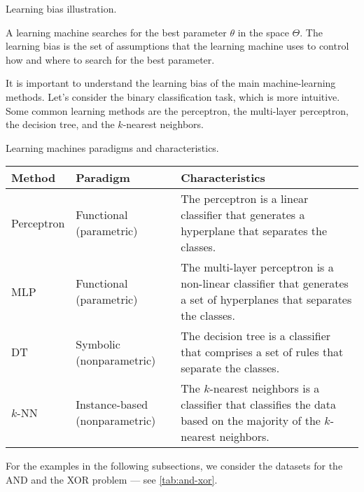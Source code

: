 \begin{figurebox}[label=fig:learning-bias]{Learning bias illustration.}
  \centering
  \tcblower
  A learning machine searches for the best parameter $\theta$ in the space $\Theta$.
  The learning bias is the set of assumptions that the learning machine uses to control
  how and where to search for the best parameter.
\end{figurebox}

It is important to understand the learning bias of the main machine-learning methods.  Let's
consider the binary classification task, which is more intuitive.  Some common learning
methods are the perceptron, the multi-layer perceptron, the decision tree, and the
$k$-nearest neighbors.

\begin{tablebox}[label=tab:paradigm]{Learning machines paradigms and characteristics.}
  \begin{tabularx}{\textwidth}{lX@{}X@{}}
    \toprule
    Method & Paradigm & Characteristics \\
    \midrule
    Perceptron & Functional (parametric) & The perceptron is a linear classifier that generates a hyperplane that separates the classes. \\
    MLP & Functional (parametric) & The multi-layer perceptron is a non-linear classifier that generates a set of hyperplanes that separates the classes. \\
    DT & Symbolic (nonparametric) & The decision tree is a classifier that comprises a set of rules that separate the classes. \\
    $k$-NN & Instance-based (nonparametric) & The $k$-nearest neighbors is a classifier that classifies the data based on the majority of the $k$-nearest neighbors. \\
    \bottomrule
  \end{tabularx}
\end{tablebox}

For the examples in the following subsections, we consider the datasets for the AND
and the XOR problem --- see \cref{tab:and-xor}.

